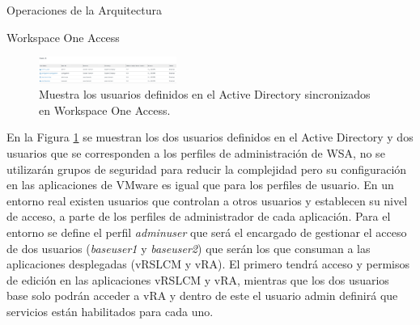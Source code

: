 \begin{subsection}{Operaciones de la Arquitectura}
\begin{subsubsection}{Workspace One Access}
        \begin{figure}[h]
            \centering
            \includegraphics[width=0.4\textwidth]{imaxes/vRealize_pruebaconcepto/usuariosDefinidos.png}
            \caption{Muestra los usuarios definidos en el Active Directory sincronizados en Workspace One Access.}
            \label{fig:users-defined-AD}
        \end{figure}
        \FloatBarrier
        En la Figura \ref{fig:users-defined-AD} se muestran los dos usuarios definidos en el Active Directory y dos usuarios que se corresponden a los perfiles de administración de WSA, no se utilizarán grupos de seguridad para reducir la complejidad pero su configuración en las aplicaciones de VMware es igual que para los perfiles de usuario. En un entorno real existen usuarios que controlan a otros usuarios y establecen su nivel de acceso, a parte de los perfiles de administrador de cada aplicación. Para el entorno se define el perfil \textit{adminuser} que será el encargado de gestionar el acceso de dos usuarios (\textit{baseuser1} y \textit{baseuser2}) que serán los que consuman a las aplicaciones desplegadas (vRSLCM y vRA). El primero tendrá acceso y permisos de edición en las aplicaciones vRSLCM y vRA, mientras que los dos usuarios base solo podrán acceder a vRA y dentro de este el usuario admin definirá que servicios están habilitados para cada uno.


    \end{subsubsection}


\end{subsection}
